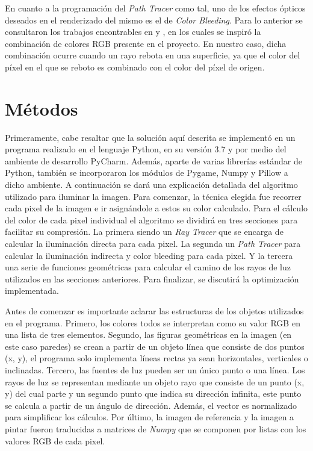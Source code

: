 \documentclass[conference]{IEEEtran}
\begin{document}
En cuanto a la programación del \textit{Path Tracer} como tal, uno de los efectos ópticos deseados en el renderizado del mismo es el de \textit{Color Bleeding}. Para lo anterior se consultaron los trabajos encontrables en \cite{b3} y \cite{b4}, en los cuales se inspiró la combinación de colores RGB presente en el proyecto. En nuestro caso, dicha combinación ocurre cuando un rayo rebota en una superficie, ya que el color del píxel en el que se reboto es combinado con el color del píxel de origen.

\section{Métodos}
Primeramente, cabe resaltar que la solución aquí descrita se implementó en un programa realizado en el lenguaje Python, en su versión 3.7 y por medio del ambiente de desarrollo PyCharm. Además, aparte de varias librerías estándar de Python, también se incorporaron los módulos de Pygame, Numpy y Pillow a dicho ambiente. A continuación se dará una explicación detallada del algoritmo utilizado para iluminar la imagen. Para comenzar, la técnica elegida fue recorrer cada pixel de la imagen e ir asignándole a estos su color calculado. Para el cálculo del color de cada pixel individual el algoritmo se dividirá en tres secciones para facilitar su compresión. La primera siendo un \textit{Ray Tracer} que se encarga de calcular la iluminación directa para cada pixel. La segunda un \textit{Path Tracer} para calcular la iluminación indirecta y color bleeding para cada pixel. Y la tercera una serie de funciones geométricas para calcular el camino de los rayos de luz utilizados en las secciones anteriores. Para finalizar, se discutirá la optimización implementada. 

Antes de comenzar es importante aclarar las estructuras de los objetos utilizados en el programa. Primero, los colores todos se interpretan como su valor RGB en una lista de tres elementos. Segundo, las figuras geométricas en la imagen (en este caso paredes) se crean a partir de un objeto línea que consiste de dos puntos (x, y), el programa solo implementa líneas rectas ya sean horizontales, verticales o inclinadas. Tercero, las fuentes de luz pueden ser un único punto o una línea. Los rayos de luz se representan mediante un objeto rayo que consiste de un punto (x, y) del cual parte y un segundo punto que indica su dirección infinita, este punto se calcula a partir de un ángulo de dirección. Además, el vector es normalizado para simplificar los cálculos. Por último, la imagen de referencia y la imagen a pintar fueron traducidas a matrices de \textit{Numpy} que se componen por listas con los valores RGB de cada pixel. 
\end{document}
